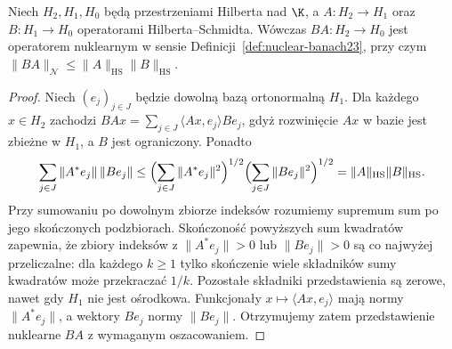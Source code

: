\begin{lemat}
\label{lem:hs-compose-nuclear23}
Niech $H_2,H_1,H_0$ będą przestrzeniami Hilberta nad $\K$, a
$A:H_2\to H_1$ oraz $B:H_1\to H_0$ operatorami
Hilberta--Schmidta. Wówczas $BA:H_2\to H_0$ jest
operatorem nuklearnym w sensie
Definicji~\ref{def:nuclear-banach23}, przy czym
$\|BA\|_{\mathcal N}\le\|A\|_{\mathrm{HS}}\|B\|_{\mathrm{HS}}$.
\end{lemat}
\begin{proof}
Niech $(e_j)_{j\in J}$ będzie dowolną bazą ortonormalną $H_1$.
Dla każdego $x\in H_2$ zachodzi
$BAx=\sum_{j\in J}\langle Ax,e_j\rangle Be_j$,
gdyż rozwinięcie $Ax$ w bazie jest zbieżne w $H_1$,
a $B$ jest ograniczony. Ponadto
\[
 \sum_{j\in J}\|A^*e_j\|\,\|Be_j\|
 \le\Bigl(\sum_{j\in J}\|A^*e_j\|^2\Bigr)^{1/2}
     \Bigl(\sum_{j\in J}\|Be_j\|^2\Bigr)^{1/2}
 =\|A\|_{\mathrm{HS}}\|B\|_{\mathrm{HS}}.
\]
Przy sumowaniu po dowolnym zbiorze indeksów rozumiemy supremum
sum po jego skończonych podzbiorach. Skończoność powyższych sum
kwadratów zapewnia, że zbiory indeksów z
$\|A^*e_j\|>0$ lub $\|Be_j\|>0$ są co najwyżej przeliczalne:
dla każdego $k\ge1$ tylko skończenie wiele składników
sumy kwadratów może przekraczać $1/k$.
Pozostałe składniki przedstawienia są zerowe,
nawet gdy $H_1$ nie jest ośrodkowa. Funkcjonały
$x\mapsto\langle Ax,e_j\rangle$ mają normy $\|A^*e_j\|$,
a wektory $Be_j$ normy $\|Be_j\|$. Otrzymujemy zatem
przedstawienie nuklearne $BA$ z wymaganym oszacowaniem.
\end{proof}

